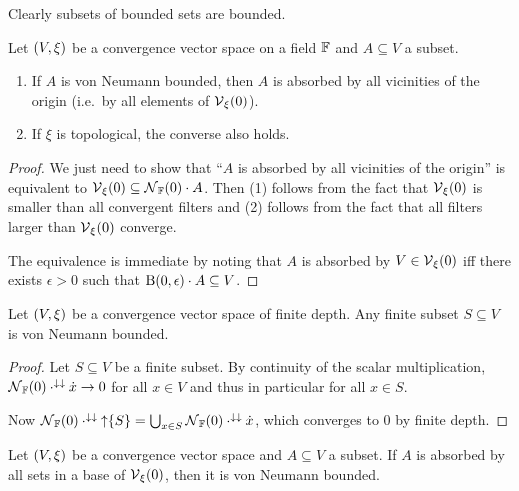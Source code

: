 Clearly subsets of bounded sets are bounded.

\begin{lemma} \label{vonNeumannBoundednessAbsorption}
Let $\left( V,\xi \right)$ be a convergence vector space on a field $\mathbb{F}$ and $A\subseteq V$ a subset. 
\begin{enumerate}
\item If $A$ is von Neumann bounded, then $A$ is absorbed by all vicinities of the origin (i.e.\ by all elements of $\operatorname{\mathcal{V}}_{\xi}(0)$).
\item If $\xi$ is topological, the converse also holds.
\end{enumerate}
\end{lemma}
\begin{proof}
We just need to show that ``$A$ is absorbed by all vicinities of the origin'' is equivalent to $\operatorname{\mathcal{V}}_\xi(0) \subseteq \operatorname{\mathcal{N}}_{\mathbb{F}}(0) \cdot A$. Then (1) follows from the fact that $\operatorname{\mathcal{V}}_\xi(0)$ is smaller than all convergent filters and (2) follows from the fact that all filters larger than $\operatorname{\mathcal{V}}_\xi(0)$ converge.

The equivalence is immediate by noting that $A$ is absorbed by $V\in \operatorname{\mathcal{V}}_\xi(0)$ iff there exists $\epsilon >0$ such that $\operatorname{B}(0,\epsilon)\cdot A \subseteq V$.
\end{proof}

\begin{lemma} \label{finiteVectorSubsetBounded}
Let $\left( V,\xi \right)$ be a convergence vector space of finite depth. Any finite subset $S\subseteq V$ is von Neumann bounded.
\end{lemma}
\begin{proof}
Let $S\subseteq V$ be a finite subset. By continuity of the scalar multiplication, $\operatorname{\mathcal{N}}_{\mathbb{F}}(0)\cdot^{\downarrow\downarrow}\dot{x} \to 0$ for all $x\in V$ and thus in particular for all $x\in S$.

Now $\operatorname{\mathcal{N}}_{\mathbb{F}}(0) \cdot^{\downarrow\downarrow} \operatorname{\uparrow}\{S\} = \bigcup_{x\in S}\operatorname{\mathcal{N}}_{\mathbb{F}}(0) \cdot^{\downarrow\downarrow} \dot{x}$, which converges to $0$ by finite depth.
\end{proof}


\begin{lemma} \label{boundedBaseCriterion}
Let $\left( V,\xi \right)$ be a convergence vector space and $A\subseteq V$ a subset. If $A$ is absorbed by all sets in a base of $\operatorname{\mathcal{V}}_{\xi}(0)$, then it is von Neumann bounded.
\end{lemma}

